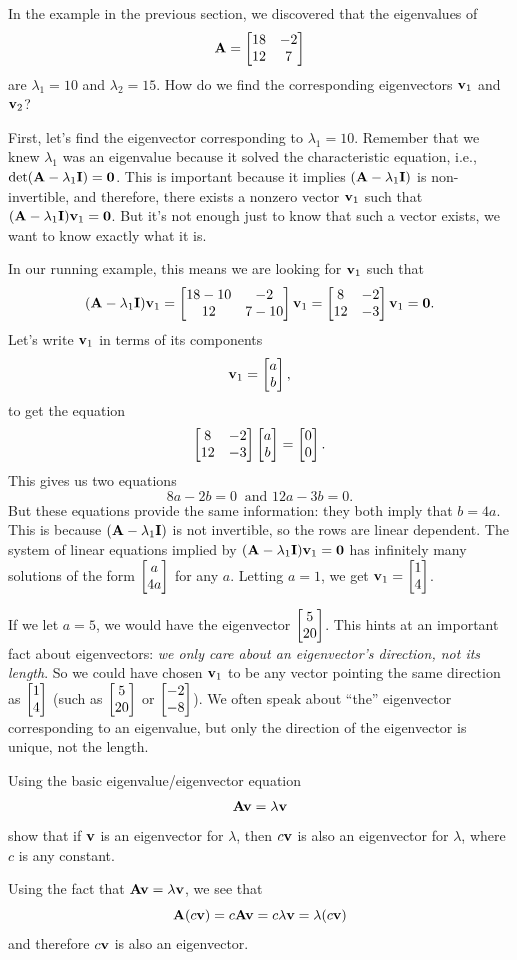 In the example in the previous section, we discovered that the eigenvalues of 
\[ \mathbf{A} = \begin{bmatrix} 18 & -2 \\ 12 & 7\end{bmatrix} \]
are $\lambda_1 = 10$ and $\lambda_2=15$. How do we find the corresponding eigenvectors $\mathbf{v}_1$ and $\mathbf{v}_2$?

First, let's find the eigenvector corresponding to $\lambda_1=10$. Remember that we knew $\lambda_1$ was an eigenvalue because it solved the characteristic equation, i.e., $\det(\mathbf{A}-\lambda_1\mathbf{I})=\mathbf{0}$.
This is important because it implies $(\mathbf{A}-\lambda_1\mathbf{I})$ is non-invertible, and therefore, there exists a nonzero vector $\mathbf{v}_1$ such that $(\mathbf{A}-\lambda_1\mathbf{I})\mathbf{v}_1=\mathbf{0}$. But it's not enough just to know that such a vector exists, we want to know exactly what it is.

In our running example, this means we are looking for $\mathbf{v}_1$ such that
$$(\mathbf{A}-\lambda_1\mathbf{I})\mathbf{v}_1 = \begin{bmatrix} 18-10 & -2 \\ 12 & 7-10\end{bmatrix}\mathbf{v}_1 = \begin{bmatrix} 8 & -2 \\ 12 & -3\end{bmatrix}\mathbf{v}_1 = \mathbf{0}.$$
Let's write $\mathbf{v}_1$ in terms of its components
$$\mathbf{v}_1 = \begin{bmatrix} a \\ b \end{bmatrix},$$
to get the equation
$$\begin{bmatrix} 8 & -2 \\ 12 & -3\end{bmatrix}\begin{bmatrix} a \\ b \end{bmatrix} = \begin{bmatrix} 0 \\ 0 \end{bmatrix}.$$
This gives us two equations
$$8a-2b=0 \ \text{ and } 12a-3b=0.$$
But these equations provide the same information: they both imply that $b = 4a$. This is because $(\mathbf{A}-\lambda_1\mathbf{I})$ is not invertible, so the rows are linear dependent. The system of linear equations implied by $(\mathbf{A}-\lambda_1\mathbf{I})\mathbf{v}_1=\mathbf{0}$ has infinitely many solutions of the form $\begin{bmatrix} a \\ 4a \end{bmatrix}$ for any $a$. Letting $a=1$, we get $\mathbf{v}_1=\begin{bmatrix} 1 \\ 4 \end{bmatrix}$.

If we let $a=5$, we would have the eigenvector $\begin{bmatrix} 5 \\ 20 \end{bmatrix}$. This hints at an important fact about eigenvectors: \textit{we only care about an eigenvector's direction, not its length}. So we could have chosen $\mathbf{v}_1$ to be any vector pointing the same direction as $\begin{bmatrix} 1 \\ 4 \end{bmatrix}$ (such as $\begin{bmatrix} 5 \\ 20 \end{bmatrix}$ or $\begin{bmatrix} -2 \\ -8 \end{bmatrix}$). We often speak about ``the'' eigenvector corresponding to an eigenvalue, but only the direction of the eigenvector is unique, not the length.

\begin{prob}
Using the basic eigenvalue/eigenvector equation
$$\mathbf{A}\mathbf{v} = \lambda\mathbf{v}$$
show that if $\mathbf{v}$ is an eigenvector for $\lambda$, then $c\mathbf{v}$ is also an eigenvector for $\lambda$, where $c$ is any constant.
\end{prob}
\begin{sol}
Using the fact that $\mathbf{A}\mathbf{v}=\lambda\mathbf{v}$, we see that
$$\mathbf{A}(c\mathbf{v}) = c\mathbf{A}\mathbf{v} = c\lambda\mathbf{v} = \lambda(c\mathbf{v})$$
and therefore $c\mathbf{v}$ is also an eigenvector.
\end{sol}

